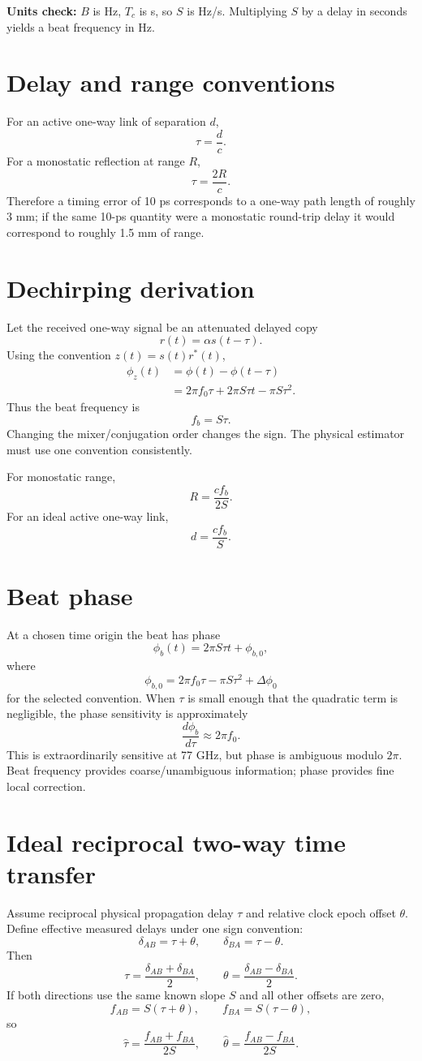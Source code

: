 \documentclass[11pt]{article}
\begin{document}
\textbf{Units check:} $B$ is Hz, $T_c$ is s, so $S$ is Hz/s. Multiplying $S$ by a delay in seconds yields a beat frequency in Hz.

\section{Delay and range conventions}
For an active one-way link of separation $d$,
\[
\tau=\frac{d}{c}.
\]
For a monostatic reflection at range $R$,
\[
\tau=\frac{2R}{c}.
\]
Therefore a timing error of 10 ps corresponds to a one-way path length of roughly 3 mm; if the same 10-ps quantity were a monostatic round-trip delay it would correspond to roughly 1.5 mm of range.

\section{Dechirping derivation}
Let the received one-way signal be an attenuated delayed copy
\[
r(t)=\alpha s(t-\tau).
\]
Using the convention $z(t)=s(t)r^*(t)$,
\begin{align}
\phi_z(t)
&=\phi(t)-\phi(t-\tau)\\
&=2\pi f_0\tau+2\pi S\tau t-\pi S\tau^2.
\end{align}
Thus the beat frequency is
\[
\boxed{f_b=S\tau}.
\]
Changing the mixer/conjugation order changes the sign. The physical estimator must use one convention consistently.

For monostatic range,
\[
\boxed{R=\frac{c f_b}{2S}}.
\]
For an ideal active one-way link,
\[
\boxed{d=\frac{c f_b}{S}}.
\]

\section{Beat phase}
At a chosen time origin the beat has phase
\[
\phi_b(t)=2\pi S\tau t + \phi_{b,0},
\]
where
\[
\phi_{b,0}=2\pi f_0\tau-\pi S\tau^2 + \Delta\phi_0
\]
for the selected convention. When $\tau$ is small enough that the quadratic term is negligible, the phase sensitivity is approximately
\[
\frac{d\phi_b}{d\tau}\approx 2\pi f_0.
\]
This is extraordinarily sensitive at 77 GHz, but phase is ambiguous modulo $2\pi$. Beat frequency provides coarse/unambiguous information; phase provides fine local correction.

\section{Ideal reciprocal two-way time transfer}
Assume reciprocal physical propagation delay $\tau$ and relative clock epoch offset $\theta$. Define effective measured delays under one sign convention:
\[
\delta_{AB}=\tau+\theta,\qquad
\delta_{BA}=\tau-\theta.
\]
Then
\[
\boxed{\tau=\frac{\delta_{AB}+\delta_{BA}}{2}},\qquad
\boxed{\theta=\frac{\delta_{AB}-\delta_{BA}}{2}}.
\]
If both directions use the same known slope $S$ and all other offsets are zero,
\[
f_{AB}=S(\tau+\theta),\qquad
f_{BA}=S(\tau-\theta),
\]
so
\[
\boxed{\hat\tau=\frac{f_{AB}+f_{BA}}{2S}},\qquad
\boxed{\hat\theta=\frac{f_{AB}-f_{BA}}{2S}}.
\]
\end{document}
